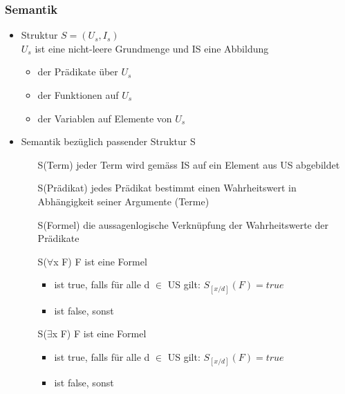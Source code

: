 \documentclass[a4paper,10pt]{article}
\begin{document}
\subsubsection{Semantik}
\begin{itemize}
	\item Struktur $S = (U_s, I_s)$ \\
		$U_s$ ist eine nicht-leere Grundmenge und IS eine Abbildung
		\begin{itemize}
			\item der Pr\"adikate \"uber $U_s$
			\item der Funktionen auf $U_s$
			\item der Variablen auf Elemente von $U_s$
		\end{itemize}
	\item Semantik bez\"uglich passender Struktur S
		\begin{itemize}
			\item[S(Term)] jeder Term wird gem\"ass IS auf ein Element aus US abgebildet
			\item[S(Pr\"adikat)] jedes Pr\"adikat bestimmt einen Wahrheitswert in Abh\"angigkeit seiner Argumente (Terme)
			\item[S(Formel)] die aussagenlogische Verkn\"upfung der Wahrheitswerte der Pr\"adikate
			\item[S($\forall$x F)] F ist eine Formel 
				\begin{itemize}
					\item ist true, falls f\"ur alle d $\in$ US gilt: $S_{[x/d]}(F) = true$
					\item ist false, sonst
				\end{itemize}
			\item[S($\exists$x F)] F ist eine Formel
				\begin{itemize}
					\item ist true, falls f\"ur alle d $\in$ US gilt: $S_{[x/d]}(F) = true$
					\item ist false, sonst
				\end{itemize}
		\end{itemize}
\end{itemize}
\end{document}
